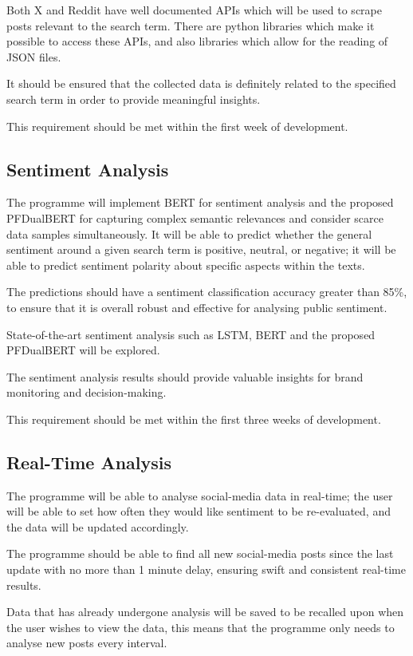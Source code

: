     Both X and Reddit have well documented APIs which will be used to scrape posts relevant to the search term. There are python libraries which make it possible to access these APIs, and also libraries which allow for the reading of JSON files.

    It should be ensured that the collected data is definitely related to the specified search term in order to provide meaningful insights.

    This requirement should be met within the first week of development.

    \subsection{Sentiment Analysis}
    The programme will implement BERT for sentiment analysis and the proposed PFDualBERT for capturing complex semantic relevances and consider scarce data samples simultaneously. It will be able to predict whether the general sentiment around a given search term is positive, neutral, or negative; it will be able to predict sentiment polarity about specific aspects within the texts.

    The predictions should have a sentiment classification accuracy greater than 85\%, to ensure that it is overall robust and effective for analysing public sentiment.

    State-of-the-art sentiment analysis such as LSTM, BERT and the proposed PFDualBERT will be explored.

    The sentiment analysis results should provide valuable insights for brand monitoring and decision-making.

    This requirement should be met within the first three weeks of development.

    \subsection{Real-Time Analysis}
    The programme will be able to analyse social-media data in real-time; the user will be able to set how often they would like sentiment to be re-evaluated, and the data will be updated accordingly.

    The programme should be able to find all new social-media posts since the last update with no more than 1 minute delay, ensuring swift and consistent real-time results.

    Data that has already undergone analysis will be saved to be recalled upon when the user wishes to view the data, this means that the programme only needs to analyse new posts every interval.

